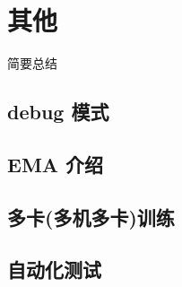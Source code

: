 \documentclass[../main.tex]{subfiles}
\begin{document}
\chapter{其他}
\vspace{-2cm}

简要总结

\section{debug 模式}

\section{EMA 介绍}

\section{多卡(多机多卡)训练}

\section{自动化测试}
\end{document}
